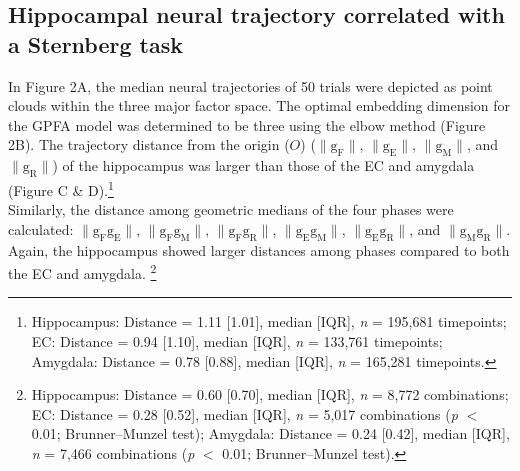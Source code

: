 \subsection{Hippocampal neural trajectory correlated with a Sternberg task}
In Figure 2A, the median neural trajectories of 50 trials were depicted as point clouds within the three major factor space. The optimal embedding dimension for the GPFA model was determined to be three using the elbow method (Figure 2B). The trajectory distance from the origin ($O$) ($\mathrm{\lVert g_{F} \rVert}$, $\mathrm{\lVert g_{E} \rVert}$, $\mathrm{\lVert g_{M} \rVert}$, and $\mathrm{\lVert g_{R} \rVert}$) of the hippocampus was larger than those of the EC and amygdala (Figure C \& D).\footnote{Hippocampus: Distance = 1.11 [1.01], median [IQR], \textit{n} = 195,681 timepoints; EC: Distance = 0.94 [1.10], median [IQR], \textit{n} = 133,761 timepoints; Amygdala: Distance = 0.78 [0.88], median [IQR], \textit{n} = 165,281 timepoints.}
\\
\indent
Similarly, the distance among geometric medians of the four phases were calculated: $\mathrm{\lVert g_{F}g_{E} \rVert}$, $\mathrm{\lVert g_{F}g_{M} \rVert}$, $\mathrm{\lVert g_{F}g_{R} \rVert}$, $\mathrm{\lVert g_{E}g_{M} \rVert}$, $\mathrm{\lVert g_{E}g_{R} \rVert}$, and $\mathrm{\lVert g_{M}g_{R} \rVert}$. Again, the hippocampus showed larger distances among phases compared to both the EC and amygdala. \footnote{Hippocampus: Distance = 0.60 [0.70], median [IQR], \textit{n} = 8,772 combinations; EC: Distance = 0.28 [0.52], median [IQR], \textit{n} = 5,017 combinations (\textit{p} $<$ 0.01; Brunner--Munzel test); Amygdala: Distance = 0.24 [0.42], median [IQR], \textit{n} = 7,466 combinations (\textit{p} $<$ 0.01; Brunner--Munzel test).}

